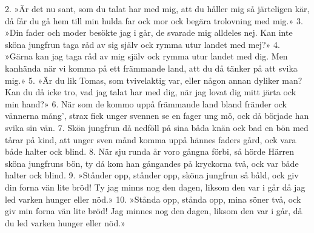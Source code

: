2.  »Är det nu sant, som du talat har med mig,
    att du håller mig så järteligen kär,
    då får du gå hem till min hulda far ock mor
    ock begära trolovning med mig.»
3.  »Din fader och moder besökte jag i går,
    de svarade mig alldeles nej.
    Kan inte sköna jungfrun taga råd av sig själv
    ock rymma utur landet med mej?»
4.  »Gärna kan jag taga råd av mig själv
    ock rymma utur landet med dig.
    Men kanhända när vi komma på ett främmande land,
    att du då tänker på att svika mig.»
5.  »Är du lik Tomas, som tvivelaktig var,
    eller någon annan dyliker man?
    Kan du då icke tro, vad jag talat har med dig,
    när jag lovat dig mitt järta ock min hand?»
6.  När som de kommo uppå främmande land
    bland fränder ock vännerna mång',
    strax fick unger svennen se en fager ung mö,
    ock då började han svika sin vän.
7.  Skön jungfrun då nedföll på sina båda knän
    ock bad en bön med tårar på kind,
    att unger sven månd komma uppå hännes faders gård,
    ock vara både halter ock blind.
8.  När sju runda år voro gångna förbi,
    så hörde Härren sköna jungfruns bön,
    ty då kom han gångandes på kryckorna två,
    ock var både halter ock blind.
9.  »Stånder opp, stånder opp, sköna jungfrun så båld,
    ock giv din forna vän lite bröd!
    Ty jag minns nog den dagen, liksom den var i går
    då jag led varken hunger eller nöd.»
10. »Stånda opp, stånda opp, mina söner två,
    ock giv min forna vän lite bröd!
    Jag minnes nog den dagen, liksom den var i går,
    då du led varken hunger eller nöd.»
